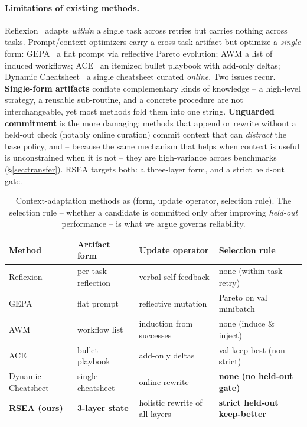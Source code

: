\documentclass{article}
\begin{document}
\paragraph{Limitations of existing methods.} Reflexion~\citep{shinn2023reflexion}
adapts \emph{within} a single task across retries but carries nothing across tasks.
Prompt/context optimizers carry a cross-task artifact but optimize a \emph{single}
form: GEPA~\citep{agrawal2025gepa} a flat prompt via reflective Pareto evolution; AWM
\citep{wang2024awm} a list of induced workflows; ACE~\citep{ace2025} an itemized
bullet playbook with add-only deltas; Dynamic Cheatsheet~\citep{suzgun2025dc} a
single cheatsheet curated \emph{online}. Two issues recur. \textbf{Single-form
artifacts} conflate complementary kinds of knowledge -- a high-level strategy, a
reusable sub-routine, and a concrete procedure are not interchangeable, yet most
methods fold them into one string. \textbf{Unguarded commitment} is the more
damaging: methods that append or rewrite without a held-out check (notably online
curation) commit context that can \emph{distract} the base policy, and -- because the
same mechanism that helps when context is useful is unconstrained when it is not --
they are high-variance across benchmarks (\S\ref{sec:transfer}). RSEA targets both:
a three-layer form, and a strict held-out gate.

\begin{table}[t]
  \centering
  \caption{Context-adaptation methods as (form, update operator, selection rule).
  The selection rule -- whether a candidate is committed only after improving
  \emph{held-out} performance -- is what we argue governs reliability.}
  \label{tab:family}
  \footnotesize
  \begin{tabular}{llll}
    \toprule
    \textbf{Method} & \textbf{Artifact form} & \textbf{Update operator} & \textbf{Selection rule} \\
    \midrule
    Reflexion & per-task reflection & verbal self-feedback & none (within-task retry) \\
    GEPA & flat prompt & reflective mutation & Pareto on val minibatch \\
    AWM & workflow list & induction from successes & none (induce \& inject) \\
    ACE & bullet playbook & add-only deltas & val keep-best (non-strict) \\
    Dynamic Cheatsheet & single cheatsheet & online rewrite & \textbf{none (no held-out gate)} \\
    \textbf{RSEA (ours)} & \textbf{3-layer state} & holistic rewrite of all layers & \textbf{strict held-out keep-better} \\
    \bottomrule
  \end{tabular}
\end{table}
\end{document}
